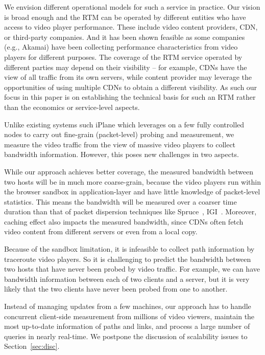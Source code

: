 

We envision different operational models  for such a service in practice.   Our
vision is broad enough and the RTM can be operated by different entities who
have access to video player performance.  These include video content
providers, CDN, or third-party companies. And it has been shown feasible as
some companies (e.g., Akamai) have been collecting performance characteristics
from video players for different purposes. The coverage of the RTM service
operated by different parties may depend on their visibility -- for example,
CDNs have the view of all traffic from its own servers, while content provider
may leverage the opportunities of using multiple CDNs to obtain a different
visibility. As such our focus in this paper is on establishing the technical
basis for such an RTM rather than the economics or service-level aspects.

Unlike existing systems such iPlane which leverages on a few fully controlled
nodes to carry out fine-grain (packet-level) probing and measurement, we measure
the video traffic from the view of massive video players to collect bandwidth
information. However, this poses new challenges in two aspects.

 While our approach achieves better coverage, the
measured bandwidth between two hosts will be in much more coarse-grain, because
the video players run within the browser sandbox in  application-layer and have
little knowledge of packet-level statistics. This means the bandwidth will be
measured over a coarser time duration than that of packet dispersion techniques like
Spruce~\cite{strauss2003measurement}, IGI~\cite{hu2003evaluation}.  Moreover, caching effect also
impacts the measured bandwidth, since CDNs often fetch video content from
different servers or even from a local copy.

 Because of the sandbox limitation, it is
infeasible to collect path information by traceroute video players. So it is
challenging to predict the bandwidth between two hosts that have never been
probed by video traffic. For example, we can have bandwidth information between
each of two clients and a server, but it is very likely that the two clients
have never been probed from one to another.


 Instead of managing updates from a few
machines, our approach has to handle concurrent client-side measurement from
millions of video viewers, maintain the most up-to-date information of paths
and links, and process a large number of queries in nearly real-time. We
postpone the discussion of scalability issues to Section~\ref{sec:disc}.


